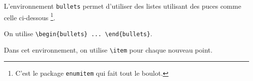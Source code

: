 L'environnement \verb+bullets+ permet d'utiliser des listes utilisant des puces comme celle ci-dessous
\footnote{
	C'est le package \texttt{enumitem} qui fait tout le boulot.
}.

\begin{bullets}
	\item On utilise \verb+\begin{bullets} ... \end{bullets}+.

	\item Dans cet environnement, on utilise \verb+\item+ pour chaque nouveau point.
\end{bullets}
